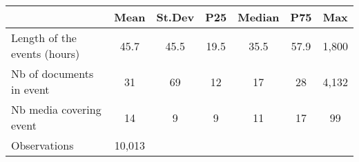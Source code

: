 {
\def\sym#1{\ifmmode^{#1}\else\(^{#1}\)\fi}
\begin{tabular}{l*{1}{cccccc}}
\hline\hline
                    &        Mean&      St.Dev&         P25&      Median&         P75&         Max\\
\hline
Length of the events (hours)&        45.7&        45.5&        19.5&        35.5&        57.9&       1,800\\
Nb of documents in event&          31&          69&          12&          17&          28&       4,132\\
Nb media covering event&          14&           9&           9&          11&          17&          99\\
\hline
Observations        &      10,013&            &            &            &            &            \\
\hline\hline
\end{tabular}
}
